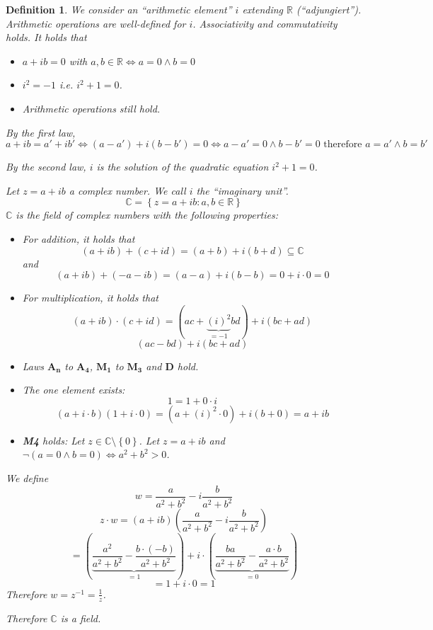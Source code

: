 \documentclass[a4paper,landscape,twocolumn]{article}
\newtheorem{defi}{Definition}
\newcommand\set[1]{\left\{#1\right\}}
\begin{document}
\begin{defi}
  We consider an \enquote{arithmetic element} $i$ extending $\mathbb R$ (\enquote{adjungiert}). %
  Arithmetic operations are well-defined for $i$. Associativity and commutativity holds.
  It holds that
  \begin{itemize}
    \item $a + ib = 0$ with $a,b \in \mathbb R \Leftrightarrow a = 0 \land b = 0$
    \item $i^2 = -1$ i.e. $i^2 + 1 = 0$.
    \item Arithmetic operations still hold.
  \end{itemize}

  By the first law,
  \[
    a + ib = a' + ib' \Leftrightarrow (a - a') + i(b - b') = 0
    \Leftrightarrow a - a' = 0 \land b - b' = 0 \text{ therefore }
    a = a' \land b = b'
  \]

  By the second law, $i$ is the solution of the quadratic equation $i^2 + 1 = 0$.

  Let $z = a + ib$ a complex number. We call $i$ the \enquote{imaginary unit}.
  \[ \mathbb C = \set{z = a + ib : a,b \in \mathbb R} \]
  $\mathbb C$ is the field of complex numbers with the following properties:
  \begin{itemize}
    \item For addition, it holds that
      \[ (a + ib) + (c + id) = (a + b) + i (b + d) \subseteq \mathbb C \]
      and
      \[ (a + ib) + (-a - ib) = (a - a) + i(b - b) = 0 + i \cdot 0 = 0 \]
    \item For multiplication, it holds that
      \[ (a + ib) \cdot (c + id) = (ac + \underbrace{(i)^2}_{=-1} b d) + i (bc + ad) \]
      \[ (ac - bd) + i (bc + ad) \]
    \item Laws $\mathbf{A_n}$ to $\mathbf{A_4}$, $\mathbf{M_1}$ to $\mathbf{M_3}$ and $\mathbf{D}$ hold.
    \item The one element exists:
      \[ 1 = 1 + 0 \cdot i \]
      \[ (a + i \cdot b) (1 + i \cdot 0) = (a + (i)^2 \cdot 0) + i (b + 0) = a + ib \]
    \item \textbf{M4} holds: Let $z \in \mathbb C \setminus \set{0}$.
      Let $z = a + ib$ and $\neg(a = 0 \land b = 0) \Leftrightarrow a^2 + b^2 > 0$.
  \end{itemize}

  We define
  \[ w = \frac{a}{a^2 + b^2} - i \frac{b}{a^2 + b^2} \]
  \[ z \cdot w = \left(a + ib\right) \left(\frac{a}{a^2 + b^2} - i \frac{b}{a^2 + b^2}\right) \]
  \[
      = \left(\underbrace{\frac{a^2}{a^2 + b^2} - \frac{b \cdot (-b)}{a^2 + b^2}}_{=1}\right)
      + i \cdot \left(\underbrace{\frac{ba}{a^2 + b^2} - \frac{a\cdot b}{a^2 + b^2}}_{=0}\right)
  \] \[
    = 1 + i \cdot 0 = 1
  \]
  Therefore $w = z^{-1} = \frac1z$.

  Therefore $\mathbb C$ is a field.
\end{defi}
\end{document}
